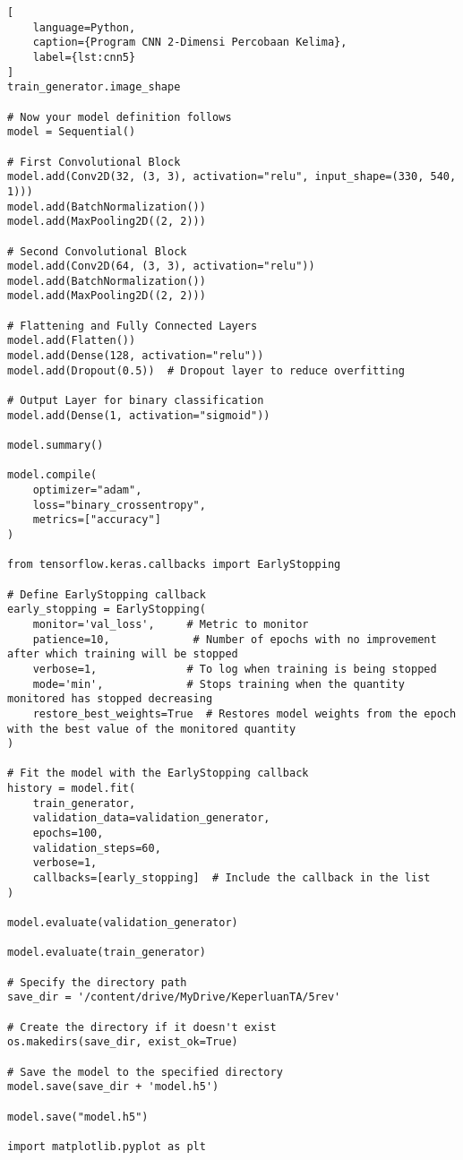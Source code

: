 \begin{lstlisting}[
    language=Python,
    caption={Program CNN 2-Dimensi Percobaan Kelima},
    label={lst:cnn5}
]
train_generator.image_shape

# Now your model definition follows
model = Sequential()

# First Convolutional Block
model.add(Conv2D(32, (3, 3), activation="relu", input_shape=(330, 540, 1)))
model.add(BatchNormalization())
model.add(MaxPooling2D((2, 2)))

# Second Convolutional Block
model.add(Conv2D(64, (3, 3), activation="relu"))
model.add(BatchNormalization())
model.add(MaxPooling2D((2, 2)))

# Flattening and Fully Connected Layers
model.add(Flatten())
model.add(Dense(128, activation="relu"))
model.add(Dropout(0.5))  # Dropout layer to reduce overfitting

# Output Layer for binary classification
model.add(Dense(1, activation="sigmoid"))

model.summary()

model.compile(
    optimizer="adam",
    loss="binary_crossentropy",
    metrics=["accuracy"]
)

from tensorflow.keras.callbacks import EarlyStopping

# Define EarlyStopping callback
early_stopping = EarlyStopping(
    monitor='val_loss',     # Metric to monitor
    patience=10,             # Number of epochs with no improvement after which training will be stopped
    verbose=1,              # To log when training is being stopped
    mode='min',             # Stops training when the quantity monitored has stopped decreasing
    restore_best_weights=True  # Restores model weights from the epoch with the best value of the monitored quantity
)

# Fit the model with the EarlyStopping callback
history = model.fit(
    train_generator,
    validation_data=validation_generator,
    epochs=100,
    validation_steps=60,
    verbose=1,
    callbacks=[early_stopping]  # Include the callback in the list
)

model.evaluate(validation_generator)

model.evaluate(train_generator)

# Specify the directory path
save_dir = '/content/drive/MyDrive/KeperluanTA/5rev'

# Create the directory if it doesn't exist
os.makedirs(save_dir, exist_ok=True)

# Save the model to the specified directory
model.save(save_dir + 'model.h5')

model.save("model.h5")

import matplotlib.pyplot as plt


\end{lstlisting}
